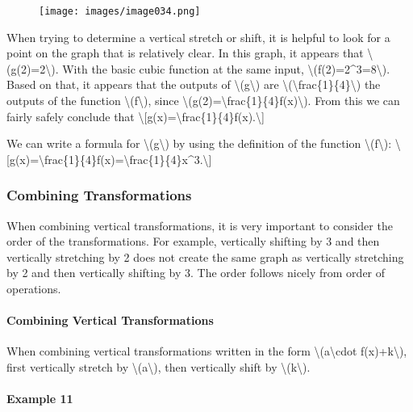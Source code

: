 \begin{figure}
\centering
\texttt{[image: images/image034.png]}
\caption{}
\end{figure}

When trying to determine a vertical stretch or shift, it is helpful to
look for a point on the graph that is relatively clear. In this graph,
it appears that \textbackslash{}(g(2)=2\textbackslash{}). With the basic
cubic function at the same input,
\textbackslash{}(f(2)=2\^{}3=8\textbackslash{}). Based on that, it
appears that the outputs of \textbackslash{}(g\textbackslash{}) are
\textbackslash{}(\textbackslash{}frac\{1\}\{4\}\textbackslash{}) the
outputs of the function \textbackslash{}(f\textbackslash{}), since
\textbackslash{}(g(2)=\textbackslash{}frac\{1\}\{4\}f(x)\textbackslash{}).
From this we can fairly safely conclude that
\textbackslash{}{[}g(x)=\textbackslash{}frac\{1\}\{4\}f(x).\textbackslash{}{]}

We can write a formula for \textbackslash{}(g\textbackslash{}) by using
the definition of the function \textbackslash{}(f\textbackslash{}):
\textbackslash{}{[}g(x)=\textbackslash{}frac\{1\}\{4\}f(x)=\textbackslash{}frac\{1\}\{4\}x\^{}3.\textbackslash{}{]}

\hypertarget{combining-transformations}{%
\subsubsection{Combining
Transformations}\label{combining-transformations}}

When combining vertical transformations, it is very important to
consider the order of the transformations. For example, vertically
shifting by 3 and then vertically stretching by 2 does not create the
same graph as vertically stretching by 2 and then vertically shifting by
3. The order follows nicely from order of operations.

\hypertarget{combining-vertical-transformations}{%
\paragraph{Combining Vertical
Transformations}\label{combining-vertical-transformations}}

When combining vertical transformations written in the form
\textbackslash{}(a\textbackslash{}cdot f(x)+k\textbackslash{}), first
vertically stretch by \textbackslash{}(a\textbackslash{}), then
vertically shift by \textbackslash{}(k\textbackslash{}).

\hypertarget{example-11}{%
\paragraph{Example 11}\label{example-11}}

